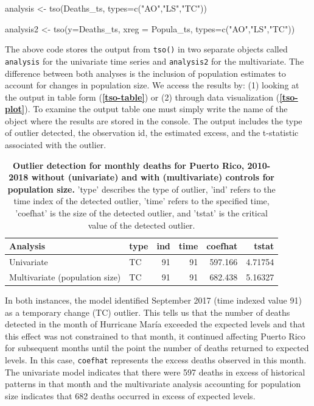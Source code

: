 \documentclass[12pt]{article}
\newenvironment{Shaded}{\begin{snugshade}}{\end{snugshade}}
\newcommand{\AttributeTok}[1]{\textcolor[rgb]{0.77,0.63,0.00}{#1}}
\newcommand{\FunctionTok}[1]{\textcolor[rgb]{0.00,0.00,0.00}{#1}}
\newcommand{\NormalTok}[1]{#1}
\newcommand{\OtherTok}[1]{\textcolor[rgb]{0.56,0.35,0.01}{#1}}
\newcommand{\StringTok}[1]{\textcolor[rgb]{0.31,0.60,0.02}{#1}}
\begin{document}
\begin{Shaded}
\begin{Highlighting}[numbers=left,,]
\NormalTok{analysis }\OtherTok{\textless{}{-}} \FunctionTok{tso}\NormalTok{(Deaths\_ts, }\AttributeTok{types=}\FunctionTok{c}\NormalTok{(}\StringTok{"AO"}\NormalTok{,}\StringTok{"LS"}\NormalTok{,}\StringTok{"TC"}\NormalTok{))}

\NormalTok{analysis2 }\OtherTok{\textless{}{-}} \FunctionTok{tso}\NormalTok{(}\AttributeTok{y=}\NormalTok{Deaths\_ts, }\AttributeTok{xreg =}\NormalTok{ Popula\_ts, }\AttributeTok{types=}\FunctionTok{c}\NormalTok{(}\StringTok{"AO"}\NormalTok{,}\StringTok{"LS"}\NormalTok{,}\StringTok{"TC"}\NormalTok{))}
\end{Highlighting}
\end{Shaded}

The above code stores the output from \texttt{tso()} in two separate
objects called \texttt{analysis} for the univariate time series and
\texttt{analysis2} for the multivariate. The difference between both
analyses is the inclusion of population estimates to account for changes
in population size. We access the results by: (1) looking at the output
in table form (\textbf{\autoref{tso-table}}) or (2) through data
visualization (\textbf{\autoref{tso-plot}}). To examine the output table
one must simply write the name of the object where the results are
stored in the console. The output includes the type of outlier detected,
the observation id, the estimated excess, and the t-statistic associated
with the outlier.

\begin{longtable}[t]{llrrrr}
\caption{\label{tab:unnamed-chunk-15}\textbf{Outlier detection for monthly deaths for Puerto Rico, 2010-2018 without (univariate) and with (multivariate) controls for population size.} 'type' describes the type of outlier, 'ind' refers to the time index of the detected outlier, 'time' refers to the specified time, 'coefhat' is the size of the detected outlier, and 'tstat' is the critical value of the detected outlier. \label{tso-table}}\\
\toprule
Analysis & type & ind & time & coefhat & tstat\\
\midrule
Univariate & TC & 91 & 91 & 597.166 & 4.71754\\
Multivariate (population size) & TC & 91 & 91 & 682.438 & 5.16327\\
\bottomrule
\end{longtable}

In both instances, the model identified September 2017 (time indexed
value 91) as a temporary change (TC) outlier. This tells us that the
number of deaths detected in the month of Hurricane María exceeded the
expected levels and that this effect was not constrained to that month,
it continued affecting Puerto Rico for subsequent months until the point
the number of deaths returned to expected levels. In this case,
\texttt{coefhat} represents the excess deaths observed in this month.
The univariate model indicates that there were 597 deaths in excess of
historical patterns in that month and the multivariate analysis
accounting for population size indicates that 682 deaths occurred in
excess of expected levels.
\end{document}
